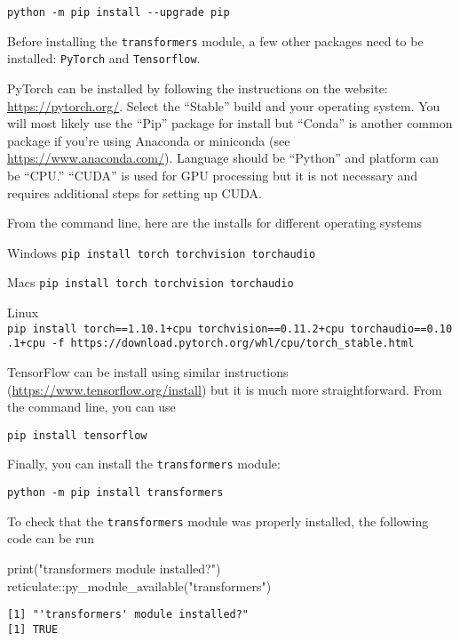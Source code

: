 \documentclass[
]{article}
\newenvironment{Shaded}{\begin{snugshade}}{\end{snugshade}}
\newcommand{\FunctionTok}[1]{\textcolor[rgb]{0.00,0.00,0.00}{#1}}
\newcommand{\NormalTok}[1]{#1}
\newcommand{\SpecialCharTok}[1]{\textcolor[rgb]{0.00,0.00,0.00}{#1}}
\newcommand{\StringTok}[1]{\textcolor[rgb]{0.31,0.60,0.02}{#1}}
\begin{document}
\texttt{python\ -m\ pip\ install\ -\/-upgrade\ pip}

Before installing the \texttt{transformers} module, a few other packages
need to be installed: \texttt{PyTorch} and \texttt{Tensorflow}.

PyTorch can be installed by following the instructions on the website:
\url{https://pytorch.org/}. Select the ``Stable'' build and your
operating system. You will most likely use the ``Pip'' package for
install but ``Conda'' is another common package if you're using Anaconda
or miniconda (see \url{https://www.anaconda.com/}). Language should be
``Python'' and platform can be ``CPU.'' ``CUDA'' is used for GPU
processing but it is not necessary and requires additional steps for
setting up CUDA.

From the command line, here are the installs for different operating
systems

Windows \texttt{pip\ install\ torch\ torchvision\ torchaudio}

Macs \texttt{pip\ install\ torch\ torchvision\ torchaudio}

Linux
\texttt{pip\ install\ torch==1.10.1+cpu\ torchvision==0.11.2+cpu\ torchaudio==0.10.1+cpu\ -f\ https://download.pytorch.org/whl/cpu/torch\_stable.html}

TensorFlow can be install using similar instructions
(\url{https://www.tensorflow.org/install}) but it is much more
straightforward. From the command line, you can use

\texttt{pip\ install\ tensorflow}

Finally, you can install the \texttt{transformers} module:

\texttt{python\ -m\ pip\ install\ transformers}

To check that the \texttt{transformers} module was properly installed,
the following code can be run

\begin{Shaded}
\begin{Highlighting}[]
\FunctionTok{print}\NormalTok{(}\StringTok{"\textquotesingle{}transformers\textquotesingle{} module installed?"}\NormalTok{)}
\NormalTok{reticulate}\SpecialCharTok{::}\FunctionTok{py\_module\_available}\NormalTok{(}\StringTok{"transformers"}\NormalTok{)}
\end{Highlighting}
\end{Shaded}

\begin{verbatim}
[1] "'transformers' module installed?"
[1] TRUE
\end{verbatim}
\end{document}
